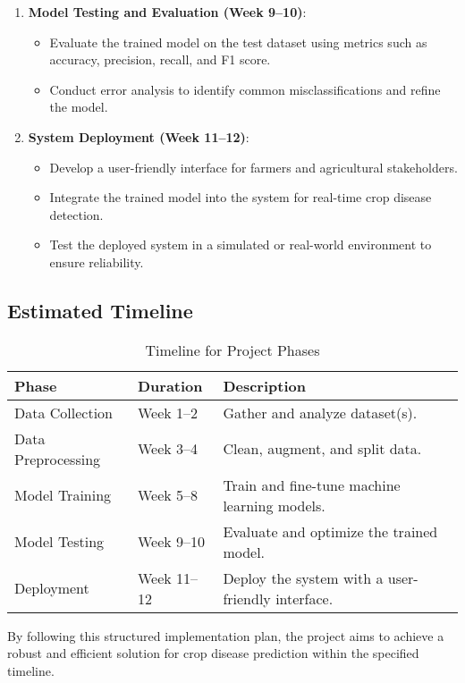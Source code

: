 \begin{enumerate}
    \item \textbf{Model Testing and Evaluation (Week 9–10)}:
    \begin{itemize}
        \item Evaluate the trained model on the test dataset using metrics such as accuracy, precision, recall, and F1 score.
        \item Conduct error analysis to identify common misclassifications and refine the model.
    \end{itemize}

    \item \textbf{System Deployment (Week 11–12)}:
    \begin{itemize}
        \item Develop a user-friendly interface for farmers and agricultural stakeholders.
        \item Integrate the trained model into the system for real-time crop disease detection.
        \item Test the deployed system in a simulated or real-world environment to ensure reliability.
    \end{itemize}
\end{enumerate}

\subsection{Estimated Timeline}
\begin{table}[H]
    \centering
    \begin{tabular}{|p{}|p{}|p{}|}
    \hline
    \textbf{Phase} & \textbf{Duration} & \textbf{Description} \\ \hline
    Data Collection & Week 1–2 & Gather and analyze dataset(s). \\ \hline
    Data Preprocessing & Week 3–4 & Clean, augment, and split data. \\ \hline
    Model Training & Week 5–8 & Train and fine-tune machine learning models. \\ \hline
    Model Testing & Week 9–10 & Evaluate and optimize the trained model. \\ \hline
    Deployment & Week 11–12 & Deploy the system with a user-friendly interface. \\ \hline
    \end{tabular}
    \caption{Timeline for Project Phases}
    \label{tab:timeline}
\end{table}

By following this structured implementation plan, the project aims to achieve a robust and efficient solution for crop disease prediction within the specified timeline.
